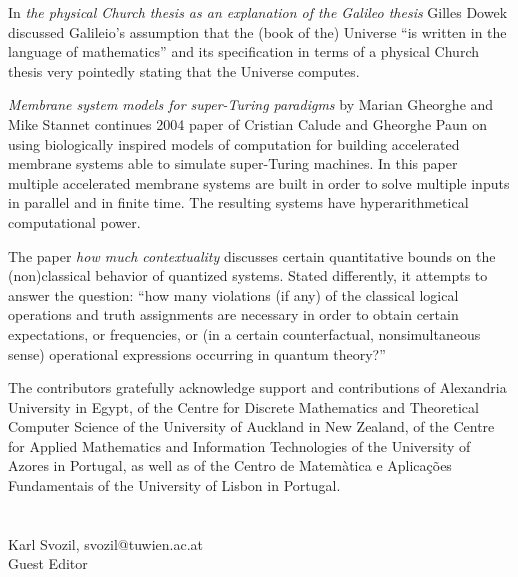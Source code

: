 \documentclass{article}
\begin{document}
In {\em the physical Church thesis as an explanation of the Galileo
thesis} Gilles Dowek
discussed Galileio's assumption that the (book of the) Universe ``is
written in the language of mathematics''
and its specification in terms of a physical Church thesis very
pointedly stating that the Universe computes.


{\em Membrane system models
for super-Turing paradigms}  by Marian  Gheorghe and Mike Stannet
continues 2004 paper of Cristian Calude and Gheorghe Paun on using
biologically inspired models of computation
for building accelerated membrane systems able to simulate
super-Turing machines.
In this paper multiple accelerated membrane systems are built in order
to solve multiple inputs in parallel and in finite time.
The resulting systems have hyperarithmetical computational power.


The paper {\em how much contextuality} discusses certain quantitative
bounds on the (non)classical behavior of quantized systems.
Stated differently, it attempts to answer the question: ``how many
violations (if any) of the classical logical operations
and truth assignments are necessary in order to obtain certain
expectations, or frequencies, or
(in a certain counterfactual, nonsimultaneous sense) operational
expressions occurring in quantum theory?''



The contributors gratefully acknowledge support and contributions of
Alexandria University in Egypt,
of the
Centre for Discrete Mathematics and Theoretical Computer Science of the
University of Auckland in New Zealand,
of the
Centre for Applied Mathematics and Information Technologies of the
University of Azores in Portugal,
as well as of the
Centro de Matem\`atica e Aplica\c{c}\~{o}es Fundamentais of the
University of Lisbon in Portugal.
\\
\\
\\
Karl Svozil, svozil@tuwien.ac.at\\
Guest Editor
\end{document}
